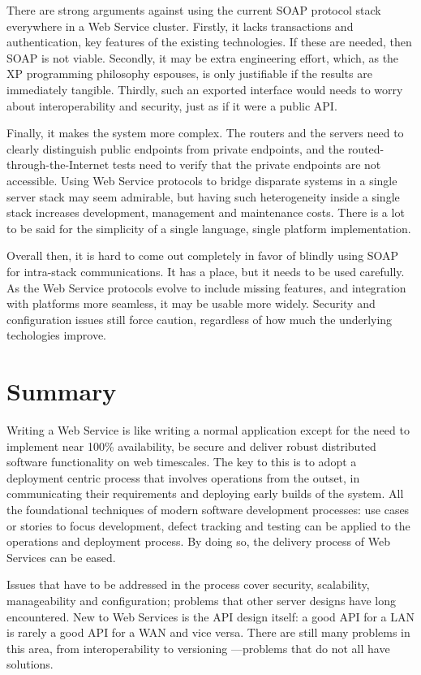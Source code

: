\documentclass[draft]{report}
\begin{document}
There are strong arguments against using the current SOAP protocol stack
everywhere in a Web Service cluster. Firstly, it lacks transactions and
authentication, key features of the existing technologies. If these are
needed, then SOAP is not viable. Secondly, it may be extra engineering
effort, which, as the XP programming philosophy espouses, is only
justifiable if the results are immediately tangible. Thirdly, such an
exported interface would needs to worry about interoperability and
security, just as if it were a public API.

Finally, it makes the system more complex. The routers and the servers
need to clearly distinguish public endpoints from private endpoints, and
the routed-through-the-Internet tests need to verify that the private
endpoints are not accessible. Using Web Service protocols to bridge
disparate systems in a single server stack may seem admirable, but
having such heterogeneity inside a single stack increases development,
management and maintenance costs. There is a lot to be said for the
simplicity of a single language, single platform implementation.


Overall then, it is hard to come out completely in favor of blindly
using SOAP for intra-stack communications. It has a place, but it needs
to be used carefully. As the Web Service protocols evolve to include
missing features, and integration with platforms more seamless, it may
be usable more widely. Security and configuration issues still force
caution, regardless of how much the underlying techologies improve.

\chapter{Summary}

Writing a Web Service is like writing a normal application except for
the need to implement near 100\% availability, be secure and deliver
robust distributed software functionality on web timescales. The key to
this is to adopt a deployment centric process that involves operations
from the outset, in communicating their requirements and deploying early
builds of the system. All the foundational techniques of modern software
development processes: use cases or stories to focus development, defect
tracking and testing can be applied to the operations and deployment
process. By doing so, the delivery process of Web Services can be eased.


Issues that have to be addressed in the process cover security,
scalability, manageability and configuration; problems that other server
designs have long encountered. New to Web Services is the API design
itself: a good API for a LAN is rarely a good API for a WAN and vice
versa. There are still many problems in this area, from interoperability
to versioning ---problems that do not all have solutions.
\end{document}
